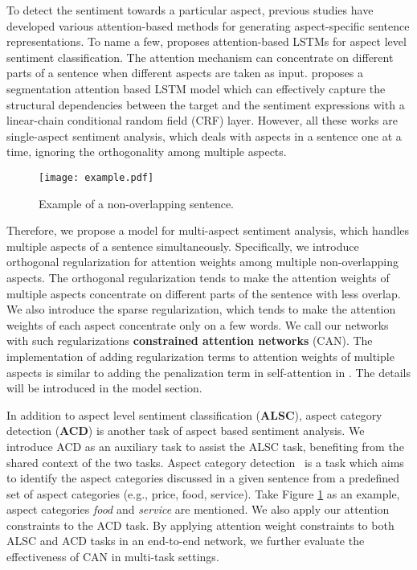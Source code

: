 \documentclass[11pt,a4paper]{article}
\begin{document}
To detect the sentiment towards a particular aspect, previous studies \cite{Wang2016Attention,Ma2017Interactive,cheng2017aspect,ma2018targeted,huang2018aspect,wang2018learning} have developed various attention-based methods for generating aspect-specific sentence representations. To name a few, \cite{Wang2016Attention} proposes attention-based LSTMs for aspect level sentiment classification. The attention mechanism can concentrate on different parts of a sentence when different aspects are taken as input. %
\cite{wang2018learning} proposes a segmentation attention based LSTM model which can effectively capture the structural dependencies between the target and the sentiment expressions with a linear-chain conditional random field (CRF) layer. However, all these works are single-aspect sentiment analysis, which deals with aspects in a sentence one at a time, ignoring the orthogonality among multiple aspects. 

\begin{figure}
\setlength{\abovecaptionskip}{0.2cm}    %
\setlength{\belowcaptionskip}{-0.2cm}   %
\centering
\texttt{[image: example.pdf]}
\caption{Example of a non-overlapping sentence.} 
  \label{sentence} 
\end{figure}

Therefore, we propose a model for multi-aspect sentiment analysis, which handles multiple aspects of a sentence simultaneously. Specifically, we introduce orthogonal regularization for attention weights among multiple non-overlapping aspects. The orthogonal regularization tends to make the attention weights of multiple aspects concentrate on different parts of the sentence with less overlap. We also introduce the sparse regularization, which tends to make the attention weights of each aspect concentrate only on a few words. We call our networks with such regularizations {\bf constrained attention networks} (CAN). The implementation of adding regularization terms to attention weights of multiple aspects is similar to adding the penalization term in self-attention in \cite{lin2017structured}. The details will be introduced in the model section.

In addition to aspect level sentiment classification ({\bf ALSC}), aspect category detection ({\bf ACD}) is another task of aspect based sentiment analysis. We introduce ACD as an auxiliary task to assist the ALSC task, benefiting from the shared context of the two tasks. Aspect category detection~\cite{Zhou2015Representation,Schouten2018Supervised} is a task which aims to identify the aspect categories discussed in a given sentence from a predefined set of aspect categories (e.g., price, food, service). Take Figure \ref{sentence} as an example, aspect categories \emph{food} and \emph{service} are mentioned. We also apply our attention constraints to the ACD task. By applying attention weight constraints to both ALSC and ACD tasks in an end-to-end network, we further evaluate the effectiveness of CAN in multi-task settings.
\end{document}
